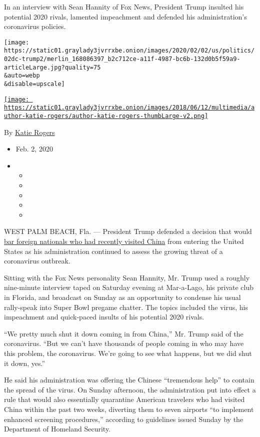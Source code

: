 In an interview with Sean Hannity of Fox News, President Trump insulted
his potential 2020 rivals, lamented impeachment and defended his
administration's coronavirus policies.

\texttt{[image: https://static01.graylady3jvrrxbe.onion/images/2020/02/02/us/politics/02dc-trump2/merlin\_168086397\_b2c712ce-a11f-4987-bc6b-132d0b5f59a9-articleLarge.jpg?quality=75\\\&auto=webp\\\&disable=upscale]}

\href{https://www.nytimes3xbfgragh.onion/by/katie-rogers}{\texttt{[image: https://static01.graylady3jvrrxbe.onion/images/2018/06/12/multimedia/author-katie-rogers/author-katie-rogers-thumbLarge-v2.png]}}

By \href{https://www.nytimes3xbfgragh.onion/by/katie-rogers}{Katie
Rogers}

\begin{itemize}
\item
  Feb. 2, 2020
\item
  \begin{itemize}
  \item
  \item
  \item
  \item
  \item
  \end{itemize}
\end{itemize}

WEST PALM BEACH, Fla. --- President Trump defended a decision that would
\href{https://www.nytimes3xbfgragh.onion/2020/01/31/business/china-travel-coronavirus.html}{bar
foreign nationals who had recently visited China} from entering the
United States as his administration continued to assess the growing
threat of a coronavirus outbreak.

Sitting with the Fox News personality Sean Hannity, Mr. Trump used a
roughly nine-minute interview taped on Saturday evening at Mar-a-Lago,
his private club in Florida, and broadcast on Sunday as an opportunity
to condense his usual rally-speak into Super Bowl pregame chatter. The
topics included the virus, his impeachment and quick-paced insults of
his potential 2020 rivals.

``We pretty much shut it down coming in from China,'' Mr. Trump said of
the coronavirus. ``But we can't have thousands of people coming in who
may have this problem, the coronavirus. We're going to see what happens,
but we did shut it down, yes.''

He said his administration was offering the Chinese ``tremendous help''
to contain the spread of the virus. On Sunday afternoon, the
administration put into effect a rule that would also essentially
quarantine American travelers who had visited China within the past two
weeks, diverting them to seven airports ``to implement enhanced
screening procedures,'' according to guidelines issued Sunday by the
Department of Homeland Security.

